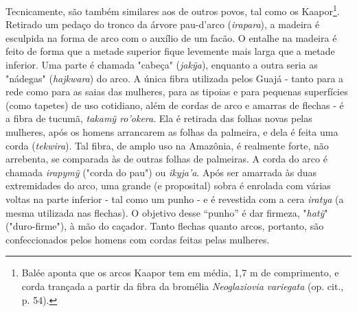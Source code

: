 Tecnicamente, são também similares aos de outros povos, tal como os
Kaapor\footnote{Balée aponta que os arcos Kaapor tem em média, 1,7 m de
  comprimento, e corda trançada a partir da fibra da bromélia
  \emph{Neoglaziovia} \emph{variegata} (op. cit., p. 54).}. Retirado um
pedaço do tronco da árvore pau-d'arco (\emph{irapara}), a madeira é
esculpida na forma de arco com o auxílio de um facão. O entalhe na
madeira é feito de forma que a metade superior fique levemente mais
larga que a metade inferior. Uma parte é chamada "cabeça"
(\emph{jakỹa}), enquanto a outra seria as "nádegas" (\emph{hajkwara}) do
arco. A única fibra utilizada pelos Guajá - tanto para a rede como para
as saias das mulheres, para as tipoias e para pequenas superfícies (como
tapetes) de uso cotidiano, além de cordas de arco e amarras de flechas -
é a fibra de tucumã, \emph{takamỹ ro'okera}. Ela é retirada das folhas
novas pelas mulheres, após os homens arrancarem as folhas da palmeira, e
dela é feita uma corda (\emph{tekwira}). Tal fibra, de amplo uso na
Amazônia, é realmente forte, não arrebenta, se comparada às de outras
folhas de palmeiras. A corda do arco é chamada \emph{irapymỹ} ("corda do
pau") ou \emph{ikyja'a}. Após ser amarrada às duas extremidades do arco,
uma grande (e proposital) sobra é enrolada com várias voltas na parte
inferior - tal como um punho - e é revestida com a cera \emph{iratya} (a
mesma utilizada nas flechas). O objetivo desse ``punho'' é dar firmeza,
"\emph{hatỹ}" ("duro-firme"), à mão do caçador. Tanto flechas quanto
arcos, portanto, são confeccionados pelos homens com cordas feitas pelas
mulheres.

